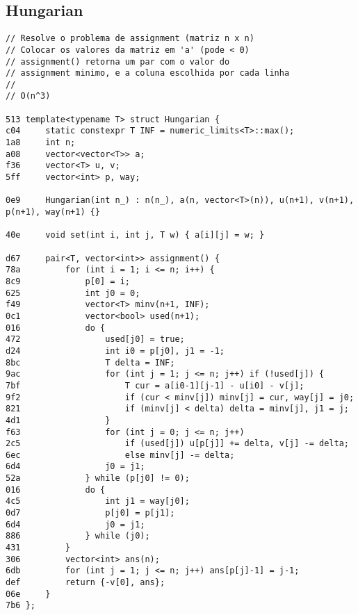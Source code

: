 \documentclass[11pt, a4paper, twoside]{article}
\begin{document}
\subsection{Hungarian}
\begin{lstlisting}
// Resolve o problema de assignment (matriz n x n)
// Colocar os valores da matriz em 'a' (pode < 0)
// assignment() retorna um par com o valor do
// assignment minimo, e a coluna escolhida por cada linha
//
// O(n^3)

513 template<typename T> struct Hungarian {
c04 	static constexpr T INF = numeric_limits<T>::max();
1a8 	int n;
a08 	vector<vector<T>> a;
f36 	vector<T> u, v;
5ff 	vector<int> p, way;
    
0e9 	Hungarian(int n_) : n(n_), a(n, vector<T>(n)), u(n+1), v(n+1), p(n+1), way(n+1) {}
    
40e 	void set(int i, int j, T w) { a[i][j] = w; }
    
d67 	pair<T, vector<int>> assignment() {
78a 		for (int i = 1; i <= n; i++) {
8c9 			p[0] = i;
625 			int j0 = 0;
f49 			vector<T> minv(n+1, INF);
0c1 			vector<bool> used(n+1);
016 			do {
472 				used[j0] = true;
d24 				int i0 = p[j0], j1 = -1;
8bc 				T delta = INF;
9ac 				for (int j = 1; j <= n; j++) if (!used[j]) {
7bf 					T cur = a[i0-1][j-1] - u[i0] - v[j];
9f2 					if (cur < minv[j]) minv[j] = cur, way[j] = j0;
821 					if (minv[j] < delta) delta = minv[j], j1 = j;
4d1 				}
f63 				for (int j = 0; j <= n; j++)
2c5 					if (used[j]) u[p[j]] += delta, v[j] -= delta;
6ec 					else minv[j] -= delta;
6d4 				j0 = j1;
52a 			} while (p[j0] != 0);
016 			do {
4c5 				int j1 = way[j0];
0d7 				p[j0] = p[j1];
6d4 				j0 = j1;
886 			} while (j0);
431 		}
306 		vector<int> ans(n);
6db 		for (int j = 1; j <= n; j++) ans[p[j]-1] = j-1;
def 		return {-v[0], ans};
06e 	}
7b6 };
\end{lstlisting}
\end{document}
